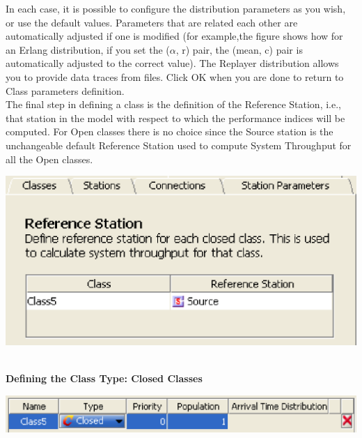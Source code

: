 In each case, it is possible to configure the distribution
parameters as you wish, or use the default values. Parameters that
are related each other are automatically adjusted if one is
modified (for example,the figure shows how for an Erlang
distribution, if you set the ($\alpha$, r) pair, the (mean, c)
pair is automatically adjusted to the correct value). The Replayer
distribution allows you to provide data traces from files.
Click OK when you are done to return to Class parameters definition.\\
The final step in defining a class is the definition of the
Reference Station, i.e., that station in the model with
respect to which the performance indices will be computed.
For Open classes there is no choice since the Source station
is the unchangeable default Reference Station used to compute
System Throughput for all the Open classes.\\
\begin{center}
\includegraphics[scale=.5]{img/jsim/reference_open1.eps}
\end{center}
\ \\
\noindent \textbf{{Defining the Class Type: Closed Classes}}\\
\begin{center}
\includegraphics[scale=.5]{img/jsim/closed_class1.eps}
\end{center}

